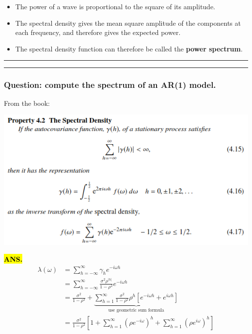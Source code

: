 \documentclass[]{article}
\begin{document}
\begin{itemize}
\item
  The power of a wave is proportional to the square of its amplitude.
\item
  The spectral density gives the mean square amplitude of the components
  at each frequency, and therefore gives the expected power.
\item
  The spectral density function can therefore be called the
  \textbf{power spectrum}.
\end{itemize}

\begin{center}\rule{0.5\linewidth}{\linethickness}\end{center}

\begin{center}\rule{0.5\linewidth}{\linethickness}\end{center}

\subsubsection{Question: compute the spectrum of an AR(1)
model.}\label{question-compute-the-spectrum-of-an-ar1-model.}

From the book:
\begin{center}\includegraphics{figure/spec_density} \end{center}

\hl{\textbf{ANS.}} 
\begin{align*}
\lambda(\omega) 
	&=\sum_{h=-\infty}^{\infty}\gamma_h e^{-i\omega h}\\
	&=\sum_{h=-\infty}^{\infty}\frac{\sigma^2 \rho ^{|h|}}{1-\rho^2}e^{-i\omega h}\\
	&=\frac{\sigma^2}{1-\rho^2} + \underbrace{\sum_{h=1}^{\infty}\frac{\sigma^2}{1-\rho^2}\rho^h\left[e^{-i\omega h} + e^{i\omega h}\right]}_{\text{use geometric sum formula}}\\
	&=\frac{\sigma^2}{1-\rho^2}\left[1 + \sum_{h=1}^{\infty}\left(\rho e^{-i\omega}\right)^h + \sum_{h=1}^{\infty}\left(\rho e^{i\omega}\right)^h\right]	
\end{align*}
\end{document}
